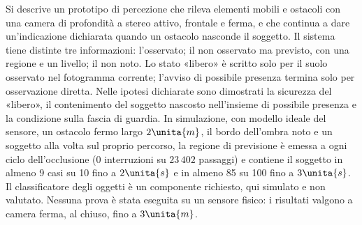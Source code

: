 Si descrive un prototipo di percezione che rileva elementi mobili e ostacoli con una camera di profondità a stereo attivo, frontale e ferma, e che continua a dare un'indicazione dichiarata quando un ostacolo nasconde il soggetto. Il sistema tiene distinte tre informazioni: l'osservato; il non osservato ma previsto, con una regione e un livello; il non noto. Lo stato «libero» è scritto solo per il suolo osservato nel fotogramma corrente; l'avviso di possibile presenza termina solo per osservazione diretta. Nelle ipotesi dichiarate sono dimostrati la sicurezza del «libero», il contenimento del soggetto nascosto nell'insieme di possibile presenza e la condizione sulla fascia di guardia. In simulazione, con modello ideale del sensore, un ostacolo fermo largo $2\unita{m}$, il bordo dell'ombra noto e un soggetto alla volta sul proprio percorso, la regione di previsione è emessa a ogni ciclo dell'occlusione (0 interruzioni su $23\,402$ passaggi) e contiene il soggetto in almeno 9 casi su 10 fino a $2\unita{s}$ e in almeno 85 su 100 fino a $3\unita{s}$. Il classificatore degli oggetti è un componente richiesto, qui simulato e non valutato. Nessuna prova è stata eseguita su un sensore fisico: i risultati valgono a camera ferma, al chiuso, fino a $3\unita{m}$.
